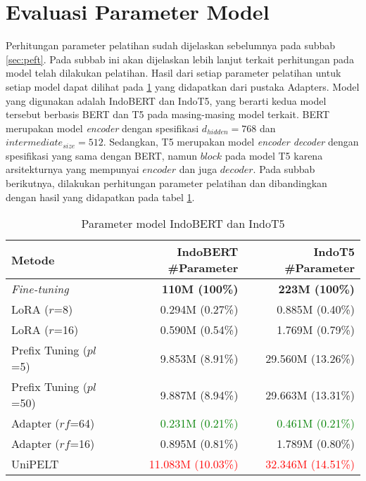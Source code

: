 \section{Evaluasi Parameter Model}

Perhitungan parameter pelatihan sudah dijelaskan sebelumnya pada subbab \ref{sec:peft}. Pada subbab ini akan dijelaskan lebih lanjut terkait perhitungan pada model telah dilakukan pelatihan. Hasil dari setiap parameter pelatihan untuk setiap model dapat dilihat pada \ref{table:param-model} yang didapatkan dari pustaka Adapters. Model yang digunakan adalah IndoBERT dan IndoT5, yang berarti kedua model tersebut berbasis BERT dan T5 pada masing-masing model terkait. BERT merupakan model \textit{encoder} dengan spesifikasi $d_{hidden} = 768$ dan $intermediate_{size} = 512$. Sedangkan, T5 merupakan model \textit{encoder decoder} dengan spesifikasi yang sama dengan BERT, namun $block$ pada model T5 karena arsitekturnya yang mempunyai $encoder$ dan juga $decoder$. Pada subbab berikutnya, dilakukan perhitungan parameter pelatihan dan dibandingkan dengan hasil yang didapatkan pada tabel \ref{table:param-model}.

\begin{table}[h]
    \centering
    \caption{Parameter model IndoBERT dan IndoT5}
    \label{table:param-model}
    \begin{tabular}{l|r|r}
        \toprule
        \textbf{Metode} & \textbf{IndoBERT \#Parameter} & \textbf{IndoT5 \#Parameter} \\
        \midrule
        \textit{Fine-tuning} & \textbf{110M (100\%)} & \textbf{223M (100\%)} \\
        LoRA ($r$=8) & 0.294M (0.27\%) & 0.885M (0.40\%) \\
        LoRA ($r$=16) & 0.590M (0.54\%) & 1.769M (0.79\%) \\
        Prefix Tuning ($pl$=5) & 9.853M (8.91\%) & 29.560M (13.26\%) \\
        Prefix Tuning ($pl$=50) & 9.887M (8.94\%) & 29.663M (13.31\%) \\
        Adapter ($rf$=64) & \textcolor{Green}{0.231M (0.21\%)} & \textcolor{Green}{0.461M (0.21\%)} \\
        Adapter ($rf$=16) & 0.895M (0.81\%) & 1.789M (0.80\%) \\
        UniPELT & \textcolor{Red}{11.083M (10.03\%)} & \textcolor{Red}{32.346M (14.51\%)} \\
        \bottomrule
    \end{tabular}
\end{table}

